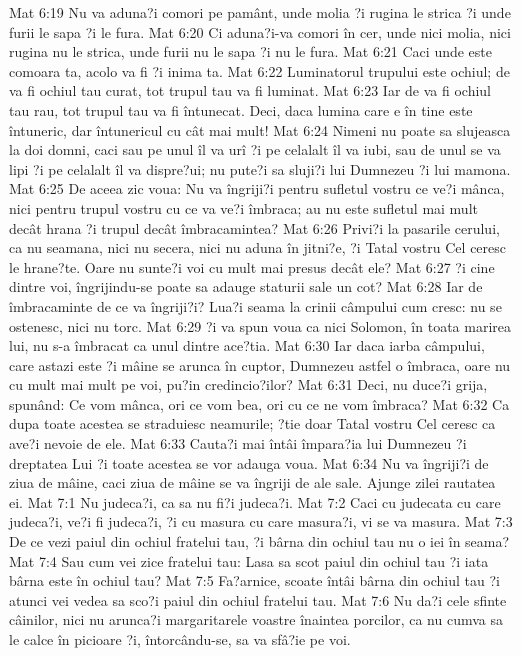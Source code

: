 Mat 6:19  Nu va aduna?i comori pe pamânt, unde molia ?i rugina le strica ?i unde furii le sapa ?i le fura.
Mat 6:20  Ci aduna?i-va comori în cer, unde nici molia, nici rugina nu le strica, unde furii nu le sapa ?i nu le fura.
Mat 6:21  Caci unde este comoara ta, acolo va fi ?i inima ta.
Mat 6:22  Luminatorul trupului este ochiul; de va fi ochiul tau curat, tot trupul tau va fi luminat.
Mat 6:23  Iar de va fi ochiul tau rau, tot trupul tau va fi întunecat. Deci, daca lumina care e în tine este întuneric, dar întunericul cu cât mai mult!
Mat 6:24  Nimeni nu poate sa slujeasca la doi domni, caci sau pe unul îl va urî ?i pe celalalt îl va iubi, sau de unul se va lipi ?i pe celalalt îl va dispre?ui; nu pute?i sa sluji?i lui Dumnezeu ?i lui mamona.
Mat 6:25  De aceea zic voua: Nu va îngriji?i pentru sufletul vostru ce ve?i mânca, nici pentru trupul vostru cu ce va ve?i îmbraca; au nu este sufletul mai mult decât hrana ?i trupul decât îmbracamintea?
Mat 6:26  Privi?i la pasarile cerului, ca nu seamana, nici nu secera, nici nu aduna în jitni?e, ?i Tatal vostru Cel ceresc le hrane?te. Oare nu sunte?i voi cu mult mai presus decât ele?
Mat 6:27  ?i cine dintre voi, îngrijindu-se poate sa adauge staturii sale un cot?
Mat 6:28  Iar de îmbracaminte de ce va îngriji?i? Lua?i seama la crinii câmpului cum cresc: nu se ostenesc, nici nu torc.
Mat 6:29  ?i va spun voua ca nici Solomon, în toata marirea lui, nu s-a îmbracat ca unul dintre ace?tia.
Mat 6:30  Iar daca iarba câmpului, care astazi este ?i mâine se arunca în cuptor, Dumnezeu astfel o îmbraca, oare nu cu mult mai mult pe voi, pu?in credincio?ilor?
Mat 6:31  Deci, nu duce?i grija, spunând: Ce vom mânca, ori ce vom bea, ori cu ce ne vom îmbraca?
Mat 6:32  Ca dupa toate acestea se straduiesc neamurile; ?tie doar Tatal vostru Cel ceresc ca ave?i nevoie de ele.
Mat 6:33  Cauta?i mai întâi împara?ia lui Dumnezeu ?i dreptatea Lui ?i toate acestea se vor adauga voua.
Mat 6:34  Nu va îngriji?i de ziua de mâine, caci ziua de mâine se va îngriji de ale sale. Ajunge zilei rautatea ei.
Mat 7:1  Nu judeca?i, ca sa nu fi?i judeca?i.
Mat 7:2  Caci cu judecata cu care judeca?i, ve?i fi judeca?i, ?i cu masura cu care masura?i, vi se va masura.
Mat 7:3  De ce vezi paiul din ochiul fratelui tau, ?i bârna din ochiul tau nu o iei în seama?
Mat 7:4  Sau cum vei zice fratelui tau: Lasa sa scot paiul din ochiul tau ?i iata bârna este în ochiul tau?
Mat 7:5  Fa?arnice, scoate întâi bârna din ochiul tau ?i atunci vei vedea sa sco?i paiul din ochiul fratelui tau.
Mat 7:6  Nu da?i cele sfinte câinilor, nici nu arunca?i margaritarele voastre înaintea porcilor, ca nu cumva sa le calce în picioare ?i, întorcându-se, sa va sfâ?ie pe voi.
